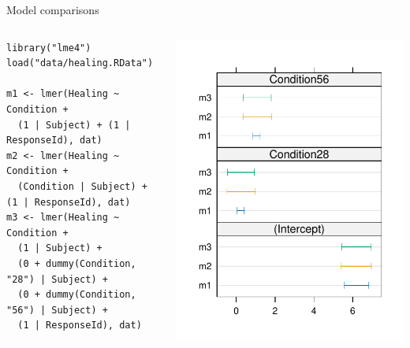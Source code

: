 \documentclass[aspectratio=169]{beamer}
\begin{document}
\begin{frame}[fragile]{Model comparisons}{\citep{Aungle2023}}
  \begin{columns}
    \begin{column}{.69\textwidth}
\begin{lstlisting}
library("lme4")
load("data/healing.RData")

m1 <- lmer(Healing ~ Condition +
  (1 | Subject) + (1 | ResponseId), dat)
m2 <- lmer(Healing ~ Condition +
  (Condition | Subject) + (1 | ResponseId), dat)
m3 <- lmer(Healing ~ Condition +
  (1 | Subject) +
  (0 + dummy(Condition, "28") | Subject) +
  (0 + dummy(Condition, "56") | Subject) +
  (1 | ResponseId), dat)
\end{lstlisting}
    \end{column}
    \begin{column}{.35\textwidth}
      \includegraphics[scale=.6]{../figures/heal_ci}
    \end{column}
  \end{columns}
\end{frame}
\end{document}
